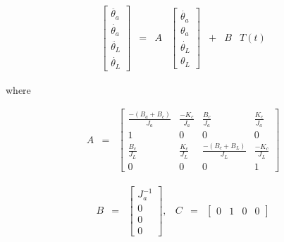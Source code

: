 

\begin{equation}\label{eq:ssTR}
\begin{array}{lllllll}

\left[
\begin{array}{l}
\ddot{\theta_a} 	\\ 
\dot{\theta_a}		\\
\ddot{\theta_L}	\\
\dot{\theta_L}
\end{array}
\right]



&


=

&

A

&

\left[
\begin{array}{l}
\dot{\theta_a} 	\\ 
\theta_a		\\
\dot{\theta_L}	\\
\theta_L
\end{array}
\right]

&

+

&

B

&

T(t)


\end{array}
\end{equation}


where


\begin{equation}
\begin{array}{lll}
A
&
=
&

\left[
\begin{array}{cccc}
\frac{-(B_a+B_c)}{J_a}   	& \frac{-K_c}{J_a}   	& \frac{B_c}{J_a}   		&	\frac{K_c}{J_a} \\
1 					& 0				& 0					&	0			\\
\frac{B_c}{J_L}			& \frac{K_c}{J_L}	& \frac{-(B_c+B_L)}{J_L}	& 	\frac{-K_c}{J_L} \\
0					& 0				& 0					&	1		
\end{array}

\right]


\end{array}
\end{equation}



\begin{equation}
\begin{array}{lllrrr}
B

&

=

&

\left[
\begin{array}{r}
J^{-1}_a 	\\ 
0		\\
0	\\
0
\end{array}
\right]
,
&
C
&
=
&
\left[
\begin{array}{cccc}
0 	&	1	&	0	&	0
\end{array}
\right]




\end{array}
\end{equation}